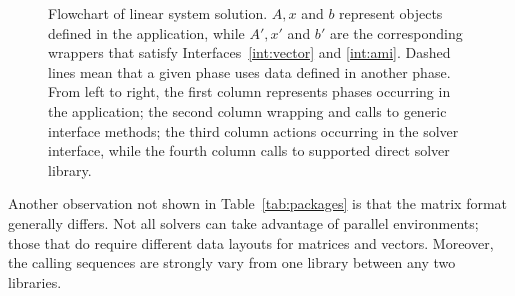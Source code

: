 \documentclass[acmtocl]{acmtrans2m}
\begin{document}
\begin{figure}
\begin{center}
\end{center}
\caption{Flowchart of linear system solution. $A, x$ and $b$ represent objects
  defined in the application, while $A', x'$ and $b'$ are the corresponding 
    wrappers that
    satisfy Interfaces~\ref{int:vector} and \ref{int:ami}. Dashed lines mean
    that a given phase uses data defined in another phase. From left to right,
  the first column 
    represents phases occurring in the application; the second column wrapping
and calls to generic interface methods; the third column actions
occurring in the solver interface, while the fourth column calls to supported
direct solver library.}
\label{fig:flowchart}
\end{figure}

Another observation not shown in Table~\ref{tab:packages} is that the matrix
format generally differs. Not all solvers can take advantage of
parallel environments; those that do require different data layouts
for matrices and
vectors. Moreover, the calling sequences are strongly vary from one library
between any two libraries.
\end{document}
